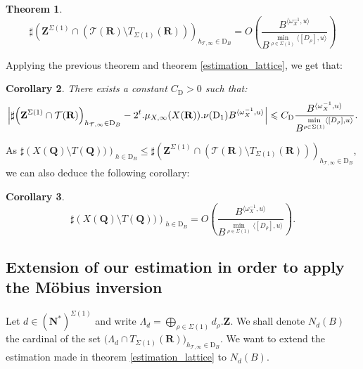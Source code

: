 \documentclass{proc-l}
\newcommand{\R}{\mathbf{R}}
\newcommand{\Z}{\mathbf{Z}}
\newcommand{\N}{\mathbf{N}}
\newcommand{\Q}{\mathbf{Q}}
\newcommand{\stackT}{\mathcal{T}}
\newcommand{\w}{\omega}
\newtheorem{theorem}{Theorem}[section]
\newtheorem{cor}[theorem]{Corollary}
\theoremstyle{definition}
\theoremstyle{remark}
\numberwithin{equation}{section}
\begin{document}
\begin{theorem}\label{number_of_points_complementary_of_the_torus_universal_torsor}
    $$ \sharp\left(\Z^{\Sigma(1)} \cap (\stackT(\R) \setminus T_{\Sigma(1)}(\R)) \right)_{h_{\stackT,\infty} \in \mathrm{D}_B} = O\left( \frac{B^{\langle \w_{X}^{-1} , u \rangle}}{B^{\min\limits_{\rho \in \Sigma(1)} \langle [D_{\rho}] , u \rangle }} \right)$$
\end{theorem}

Applying the previous theorem and theorem \ref{estimation_lattice}, we get that:

\begin{cor}
    There exists a constant $C_{\mathrm{D}} > 0$ such that:
    $$\Big| \sharp \Bigl( \Z^{\Sigma(1)} \cap \stackT(\R) \Bigr)_{h_{\stackT,\infty} \in \mathrm{D}_{B}}  - 2^t . \mu_{X,\infty}(X(\R)). \nu(\mathrm{D}_1) B^{ \langle \w_{X}^{-1} , u \rangle } \Big| \leqslant C_{\mathrm{D}} \frac{B^{\langle \w_X^{-1},u\rangle}}{B^{ \min\limits_{\rho \in \Sigma(1)} \langle [D_{\rho}],u\rangle } } .$$

\end{cor}

As $\sharp\left(X(\Q) \setminus T(\Q)) \right)_{h \in \mathrm{D}_B} \leqslant \sharp\left(\Z^{\Sigma(1)} \cap (\stackT(\R) \setminus T_{\Sigma(1)}(\R)) \right)_{h_{\stackT,\infty} \in \mathrm{D}_B}$, we can also deduce the following corollary:

\begin{cor}\label{number_of_points_complementary_of_the_torus_variety}
    $$ \sharp\left(X(\Q) \setminus T(\Q)) \right)_{h \in \mathrm{D}_B} = O\left( \frac{B^{\langle \w_{X}^{-1} , u \rangle}}{B^{\min\limits_{\rho \in \Sigma(1)} \langle [D_{\rho}] , u \rangle }} \right) .$$
\end{cor}




\subsection{Extension of our estimation in order to apply the Möbius inversion}

Let $d \in (\N^*)^{\Sigma(1)}$ and write $\Lambda_d = \bigoplus\limits_{\rho \in \Sigma(1)} d_{\rho}.\Z$. We shall denote $N_d(B)$ the cardinal of the set $\Big( \Lambda_d \cap T_{\Sigma(1)}(\R) \Big)_{h_{\stackT,\infty} \in \mathrm{D}_{B}}$. We want to extend the estimation made in theorem \ref{estimation_lattice} to $N_d(B)$.
\end{document}
